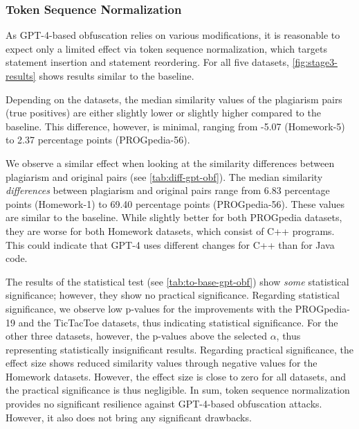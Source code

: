 \subsubsection{Token Sequence Normalization}

As GPT-4-based obfuscation relies on various modifications, it is reasonable to expect only a limited effect via token sequence normalization, which targets statement insertion and statement reordering. For all five datasets, \autoref{fig:stage3-results} shows results similar to the baseline.

Depending on the datasets, the median similarity values of the plagiarism pairs (true positives) are either slightly lower or slightly higher compared to the baseline. This difference, however, is minimal, ranging from -5.07 (Homework-5) to 2.37 percentage points (PROGpedia-56). 

We observe a similar effect when looking at the similarity differences between plagiarism and original pairs (see \autoref{tab:diff-gpt-obf}).
The median similarity \textit{differences} between plagiarism and original pairs range from 6.83 percentage points (Homework-1) to 69.40 percentage points (PROGpedia-56).
These values are similar to the baseline. While slightly better for both PROGpedia datasets, they are worse for both Homework datasets, which consist of C++ programs. This could indicate that GPT-4 uses different changes for C++ than for Java code.

The results of the statistical test (see \autoref{tab:to-base-gpt-obf}) show \textit{some} statistical significance; however, they show no practical significance.
Regarding statistical significance, we observe low p-values for the improvements with the PROGpedia-19 and the TicTacToe datasets, thus indicating statistical significance.
For the other three datasets, however, the p-values above the selected $\alpha$, thus representing statistically insignificant results.
Regarding practical significance, the effect size shows reduced similarity values through negative values for the Homework datasets. However, the effect size is close to zero for all datasets, and the practical significance is thus negligible.
In sum, token sequence normalization provides no significant resilience against GPT-4-based obfuscation attacks. However, it also does not bring any significant drawbacks.


